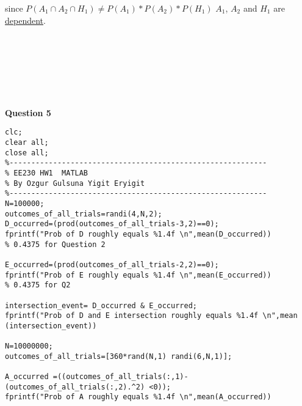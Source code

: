 \documentclass{METUHW} %
\begin{document}
since $P(A_1 \cap A_2 \cap H_1)  \neq P(A_1)*P(A_2)*P(H_1)$ $A_1$, $A_2$ and $H_1$ are \underline{dependent}.\\
\text{}\\
\text{}\\
\text{}\\
\text{}\\
\text{}\\
\text{}\\
\raggedright
\textbf{\large Question 5}\\
\begin{lstlisting}
clc;
clear all;
close all;
%-----------------------------------------------------------
% EE230 HW1  MATLAB
% By Ozgur Gulsuna Yigit Eryigit
%-----------------------------------------------------------
N=100000;
outcomes_of_all_trials=randi(4,N,2);
D_occurred=(prod(outcomes_of_all_trials-3,2)==0);
fprintf("Prob of D roughly equals %1.4f \n",mean(D_occurred)) 
% 0.4375 for Question 2

E_occurred=(prod(outcomes_of_all_trials-2,2)==0);
fprintf("Prob of E roughly equals %1.4f \n",mean(E_occurred)) 
% 0.4375 for Q2

intersection_event= D_occurred & E_occurred;
fprintf("Prob of D and E intersection roughly equals %1.4f \n",mean (intersection_event))

N=10000000;
outcomes_of_all_trials=[360*rand(N,1) randi(6,N,1)];

A_occurred =((outcomes_of_all_trials(:,1)-(outcomes_of_all_trials(:,2).^2) <0));
fprintf("Prob of A roughly equals %1.4f \n",mean(A_occurred))

\end{lstlisting}
\end{document}
